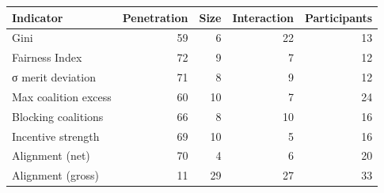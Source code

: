 \begin{tabular}{lrrrr}
\toprule
Indicator & Penetration & Size & Interaction & Participants \\
\midrule
Gini & 59 & 6 & 22 & 13 \\
Fairness Index & 72 & 9 & 7 & 12 \\
σ merit deviation & 71 & 8 & 9 & 12 \\
Max coalition excess & 60 & 10 & 7 & 24 \\
Blocking coalitions & 66 & 8 & 10 & 16 \\
Incentive strength & 69 & 10 & 5 & 16 \\
Alignment (net) & 70 & 4 & 6 & 20 \\
Alignment (gross) & 11 & 29 & 27 & 33 \\
\bottomrule
\end{tabular}
